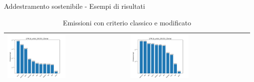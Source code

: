 \begin{frame}{Addestramento sostenibile - Esempi di risultati}
    \begin{table}[H]
        \centering
        \footnotesize
        \setlength\tabcolsep{0pt}
        \begin{tabularx}{\textwidth}{|X|X|}
            \hline
            \includegraphics[width=0.5\textwidth, height=0.6\textheight, trim=0 0 0 0]{images/emissions_LFM-1b_artist_20U50I_25strat_earlyClassic.png} &
            \includegraphics[width=0.5\textwidth, height=0.6\textheight, trim=0 0 0 0]{images/emissions_LFM-1b_artist_20U50I_25strat_earlyModified.png} \\
            \hline
        \end{tabularx}
        \caption{Emissioni con criterio classico e modificato}
    \end{table}
\end{frame}



